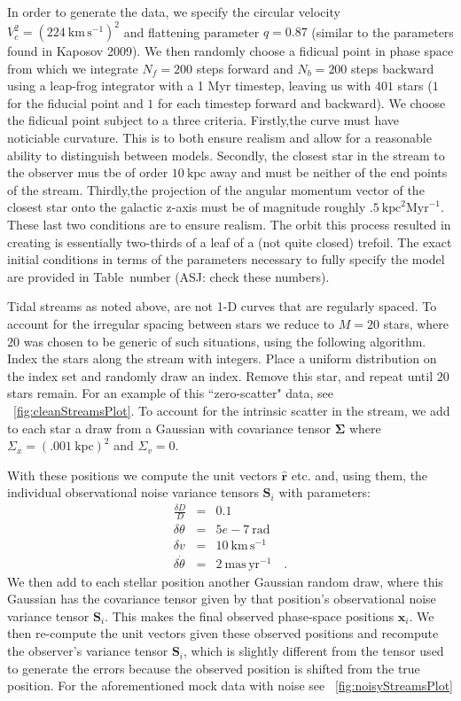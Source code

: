 \documentclass[12pt,preprint]{aastex}
\newcommand{\mtensor}[1]{\boldsymbol{#1}}
\newcommand{\mS}{\mtensor{S}}
\newcommand{\mSigma}{\mtensor{\Sigma}}
\newcommand{\mvector}[1]{\mtensor{#1}}
\renewcommand{\vr}{\mvector{r}}
\newcommand{\vx}{\mvector{x}}
\newcommand{\rhat}{\hat{\vr}}
\newcommand{\unit}[1]{\mathrm{#1}}
\newcommand{\kpc}{\unit{kpc}}
\newcommand{\Myr}{\unit{Myr}}
\newcommand{\km}{\unit{km}}
\newcommand{\s}{\unit{s}}
\newcommand{\kmps}{\km\,\s^{-1}}
\newcommand{\rad}{\unit{rad}}
\newcommand{\mas}{\unit{mas}}
\newcommand{\yr}{\unit{yr}}
\newcommand{\maspyr}{\mas\,\yr^{-1}}
\begin{document}
In order to generate the data, we specify the circular velocity $V_c^2 = (224~\kmps)^2$ 
and flattening parameter $q=0.87$ (similar to the parameters found in Kaposov 2009).
We then randomly choose a fidicual point in phase space from which we integrate
$N_f = 200$ steps forward and $N_b = 200$ steps backward using a leap-frog integrator
with a 1 Myr timestep, leaving us with $401$ stars ($1$ for the fiducial point and
$1$ for each timestep forward and backward). We choose the fidicual point subject 
to a three criteria. Firstly,the curve must have noticiable curvature. This is 
to both ensure realism and allow for a reasonable ability to distinguish between models.
Secondly, the closest star in the stream to the observer mus tbe of order $10~\kpc$ away
and must be neither of the end points of the stream. Thirdly,the projection of
the angular momentum vector of the closest star onto the galactic z-axis must be 
of magnitude roughly $.5~\kpc^2\Myr^{-1}$. These last two conditions are to ensure realism.
The orbit this process resulted in creating is essentially two-thirds of a leaf of a 
(not quite closed) trefoil. The exact initial conditions in terms of the parameters
necessary to fully specify the model are provided in Table~number (ASJ: check these
numbers).

Tidal streams as noted above, are not 1-D curves that are regularly spaced. To
account for the irregular spacing between stars we reduce to $M=20$ stars, where
$20$ was chosen to be generic of such situations, using the following algorithm.
Index the stars along the stream with integers. Place a uniform 
distribution on the index set and randomly draw an index. Remove this star, and 
repeat until $20$ stars remain. For an example of this ``zero-scatter" data, see 
\figurename~\ref{fig:cleanStreamsPlot}. To account for the intrinsic scatter in 
the stream, we add to each star a draw from a Gaussian with covariance tensor 
$\mSigma$ where $\Sigma_x = (.001~\kpc)^2$ and $\Sigma_v = 0$.

With these positions we compute the unit vectors $\rhat$ etc. and, using them, 
the individual observational noise variance tensors $\mS_i$ with parameters:
\begin{eqnarray}\displaystyle
\frac{\delta D}{D} &=& 0.1
\nonumber\\
\delta\theta &=& 5e-7~\rad
\nonumber\\
\delta v &=& 10~\kmps
\nonumber\\
\delta\dot{\theta} &=& 2~\maspyr
\quad.
\end{eqnarray}
We then add to each stellar position another Gaussian random draw, where this Gaussian 
has the covariance tensor given by that position's observational noise variance 
tensor $\mS_i$.  This makes the final observed phase-space positions $\vx_i$.  
We then re-compute the unit vectors given these observed positions and recompute the
observer's variance tensor $\mS_i$, which is slightly different from
the tensor used to generate the errors because the observed position
is shifted from the true position. For the aforementioned mock data with noise
see \figurename~\ref{fig:noisyStreamsPlot} 
\end{document}
